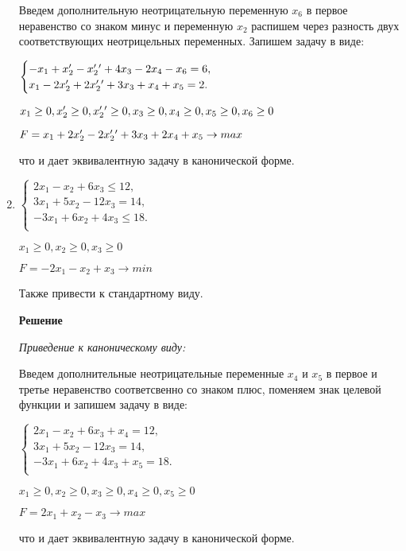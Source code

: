 \documentclass[12pt]{article}
\begin{document}
\begin{enumerate}
Введем дополнительную неотрицательную переменную $x_6$ в первое неравенство со знаком минус и переменную $x_2$ распишем через разность двух соответствующих неотрицельных переменных. Запишем задачу в виде:
\begin{center}
$\begin{cases}
  -x_1 +x_2\rq{} - x_2\rq{}\rq{}+4x_3-2x_4 - x_6 =  6,\\ 
  x_1-2x_2\rq{} +2 x_2\rq{}\rq{}+3x_3 + x_4+x_5 =2.\\
\end{cases}$

$x_1\ge0,x_2\rq{}\ge0, x_2\rq{}\rq{}\ge0, x_3\ge0, x_4\ge0, x_5\ge0, x_6\ge0$

$F=x_1+2x_2\rq{} - 2x_2\rq{}\rq{}+ 3x_3 + 2x_4+x_5\rightarrow max$\end{center}
что и дает эквивалентную задачу в канонической форме.
\newpage
\item
\begin{center}
$\begin{cases}
  2x_1 -x_2+6x_3 \le 12,\\ 
 3x_1 +5x_2 - 12x_3 = 14,\\
 -3x_1 +6x_2 +4x_3\le18.\\
\end{cases}$

$x_1\ge0, x_2\ge0, x_3\ge0$

$F=-2x_1-x_2 +x_3 \rightarrow min$

Также привести к стандартному виду.
\end{center}

\textbf{Решение}

\textit{Приведение к каноническому виду:}

Введем дополнительные неотрицательные переменные $x_4$ и $ x_5$ в первое и третье неравенство соответсвенно со знаком плюс, поменяем знак целевой функции и запишем задачу в виде:
\begin{center}
$\begin{cases}
  2x_1 -x_2+6x_3 + x_4 = 12,\\ 
 3x_1 +5x_2 - 12x_3 = 14,\\
 -3x_1 +6x_2 +4x_3 + x_5=18.\\
\end{cases}$

$x_1\ge0, x_2\ge0, x_3\ge0, x_4\ge0, x_5\ge0$

$F=2x_1+x_2 -x_3 \rightarrow max$
\end{center}
что и дает эквивалентную задачу в канонической форме.


\end{enumerate}
\end{document}
